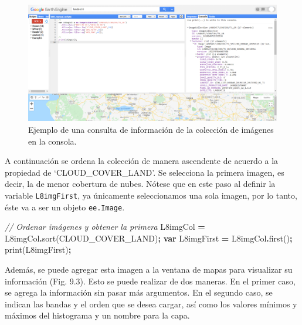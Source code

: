 \documentclass[
  12pt,
  letterpaper,
  twoside]{book}
\newenvironment{Shaded}{\begin{snugshade}}{\end{snugshade}}
\newcommand{\CommentTok}[1]{\textcolor[rgb]{0.56,0.35,0.01}{\textit{#1}}}
\newcommand{\FunctionTok}[1]{\textcolor[rgb]{0.00,0.00,0.00}{#1}}
\newcommand{\KeywordTok}[1]{\textcolor[rgb]{0.13,0.29,0.53}{\textbf{#1}}}
\newcommand{\NormalTok}[1]{#1}
\newcommand{\OperatorTok}[1]{\textcolor[rgb]{0.81,0.36,0.00}{\textbf{#1}}}
\newcommand{\StringTok}[1]{\textcolor[rgb]{0.31,0.60,0.02}{#1}}
\begin{document}
\begin{figure}[btp]

{\centering \includegraphics[width=1\linewidth]{Img/CamposImgCol} 

}

\caption{Ejemplo de una consulta de información de la colección de imágenes en la consola.}\label{fig:unnamed-chunk-150}
\end{figure}

A continuación se ordena la colección de manera ascendente de acuerdo a la propiedad de `CLOUD\_COVER\_LAND'. Se selecciona la primera imagen, es decir, la de menor cobertura de nubes. Nótese que en este paso al definir la variable \texttt{L8imgFirst}, ya únicamente seleccionamos una sola imagen, por lo tanto, éste va a ser un objeto \texttt{ee.Image}.

\begin{Shaded}
\begin{Highlighting}[]
\CommentTok{// Ordenar imágenes y obtener la primera}
\NormalTok{L8imgCol }\OperatorTok{=}\NormalTok{ L8imgCol}\OperatorTok{.}\FunctionTok{sort}\NormalTok{(}\StringTok{\textquotesingle{}CLOUD\_COVER\_LAND\textquotesingle{}}\NormalTok{)}\OperatorTok{;}
\KeywordTok{var}\NormalTok{ L8imgFirst }\OperatorTok{=}\NormalTok{ L8imgCol}\OperatorTok{.}\FunctionTok{first}\NormalTok{()}\OperatorTok{;} 
\FunctionTok{print}\NormalTok{(L8imgFirst)}\OperatorTok{;}
\end{Highlighting}
\end{Shaded}

Además, se puede agregar esta imagen a la ventana de mapas para visualizar su información (Fig. 9.3). Esto se puede realizar de dos maneras. En el primer caso, se agrega la información sin pasar más argumentos. En el segundo caso, se indican las bandas y el orden que se desea cargar, así como los valores mínimos y máximos del histograma y un nombre para la capa.
\end{document}
